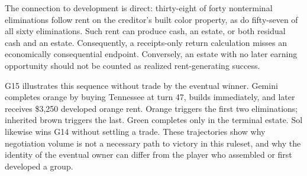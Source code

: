 The connection to development is direct: thirty-eight of forty nonterminal eliminations follow rent on the creditor's built color property, as do fifty-seven of all sixty eliminations. Such rent can produce cash, an estate, or both residual cash and an estate. Consequently, a receipts-only return calculation misses an economically consequential endpoint. Conversely, an estate with no later earning opportunity should not be counted as realized rent-generating success.

G15 illustrates this sequence without trade by the eventual winner. Gemini completes orange by buying Tennessee at turn 47, builds immediately, and later receives \$3,250 developed orange rent. Orange triggers the first two eliminations; inherited brown triggers the last. Green completes only in the terminal estate. Sol likewise wins G14 without settling a trade. These trajectories show why negotiation volume is not a necessary path to victory in this ruleset, and why the identity of the eventual owner can differ from the player who assembled or first developed a group.
